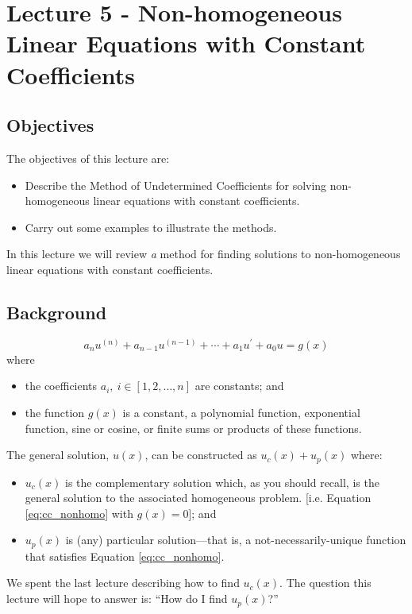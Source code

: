\chapter{Lecture 5 - Non-homogeneous Linear Equations with Constant Coefficients}
\label{ch:lec5}
\section{Objectives}
The objectives of this lecture are:
\begin{itemize}
\item Describe the Method of Undetermined Coefficients for solving non-homogeneous linear equations with constant coefficients.
\item Carry out some examples to illustrate the methods.
\end{itemize}
In this lecture we will review \emph{a} method for finding solutions to non-homogeneous linear equations with constant coefficients.
\section{Background}
\begin{equation}
a_nu^{(n)} + a_{n-1}u^{(n-1)}+\cdots+a_1u^{\prime}+a_0u = g(x)
\label{eq:cc_nonhomo}
\end{equation}
where
\begin{itemize}
\item the coefficients $a_i, \ i\in [1,2,\dots,n]$ are constants; and
\item the function $g(x)$ is a constant, a polynomial function, exponential function, sine or cosine, or finite sums or products of these functions.
\end{itemize}
The general solution, $u(x)$, can be constructed as $u_c(x)+u_p(x)$ where:
\begin{itemize}
\item $u_c(x)$ is the complementary solution which, as you should recall, is the general solution to the associated homogeneous problem. [i.e. Equation \ref{eq:cc_nonhomo} with $g(x)=0$]; and
\item $u_p(x)$ is (any) particular solution---that is, a not-necessarily-unique function that satisfies Equation \ref{eq:cc_nonhomo}.
\end{itemize}
We spent the last lecture describing how to find $u_c(x)$.  The question this lecture will hope to answer is: ``How do I find $u_p(x)$?''  
